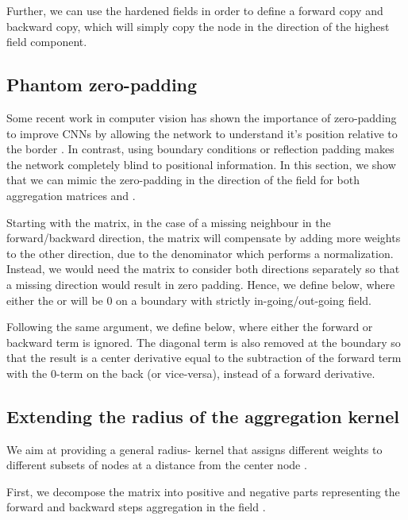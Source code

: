 \documentclass{article} \usepackage{arxiv,times}
\begin{document}
Further, we can use the hardened fields in order to define a forward copy and backward copy, which will simply copy the node in the direction of the highest field component.




\subsection{Phantom zero-padding}
\label{app:agg:zero-padding}

Some recent work in computer vision has shown the importance of zero-padding to improve CNNs by allowing the network to understand it's position relative to the border \cite{islam_how_2020}. In contrast, using boundary conditions or reflection padding makes the network completely blind to positional information. In this section, we show that we can mimic the zero-padding in the direction of the field  for both aggregation matrices  and .

Starting with the  matrix, in the case of a missing neighbour in the forward/backward direction, the matrix will compensate by adding more weights to the other direction, due to the denominator which performs a normalization. Instead, we would need the matrix to consider both directions separately so that a missing direction would result in zero padding. Hence, we define  below, where either the  or  will be 0 on a boundary with strictly in-going/out-going field.



Following the same argument, we define  below, where either the forward or backward term is ignored. The diagonal term is also removed at the boundary so that the result is a center derivative equal to the subtraction of the forward term with the 0-term on the back (or vice-versa), instead of a forward derivative.




\subsection{Extending the radius of the aggregation kernel}
\label{app:radius-r-kernel}

We aim at providing a general radius- kernel  that assigns different weights to different subsets of nodes  at a distance  from the center node .

First, we decompose the matrix  into positive and negative parts  representing the forward and backward steps aggregation in the field . 
\end{document}

